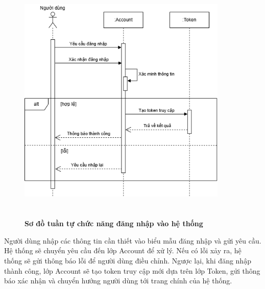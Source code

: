 \begin{figure}[H]
	\centering
	\includegraphics[width=10cm,height=12cm]{Images/sequence/user/login.drawio.png}
	\caption[Sơ đồ tuần tự chức năng đăng nhập vào hệ thống]{\bfseries \fontsize{12pt}{0pt}
		\selectfont Sơ đồ tuần tự chức năng đăng nhập vào hệ thống}
	\label{sequence_login} %
\end{figure}
Người dùng nhập các thông tin cần thiết vào biểu mẫu đăng nhập và gửi yêu cầu. Hệ thống sẽ chuyển yêu cầu đến lớp Account để xử lý.
Nếu có lỗi xảy ra, hệ thống sẽ gửi thông báo lỗi để người dùng điều chỉnh. Ngược lại, khi đăng nhập thành công, lớp Account sẽ tạo token truy cập mới dựa trên lớp Token, gửi thông báo xác nhận và chuyển hướng người dùng tới trang chính của hệ thống.

